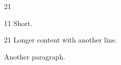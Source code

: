 \documentclass[paper=A4]{ropas-poster}
\begin{document}
\begin{postergrid}{2}{1}
\begin{posterblock}{1}{1}
Short.
\end{posterblock}
\begin{posterblock}{2}{1}
Longer content with another line.

Another paragraph.
\end{posterblock}
\end{postergrid}
\end{document}
